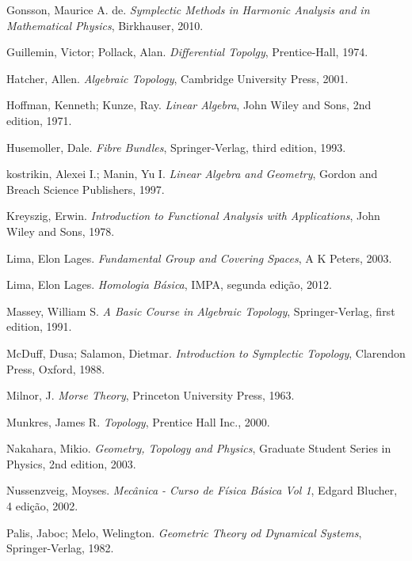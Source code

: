 \documentclass[12pt]{book}
\begin{document}
\begin{thebibliography}{9}
		Gonsson, Maurice A. de.
		\emph{Symplectic Methods in Harmonic Analysis and in Mathematical Physics},
		Birkhauser, 2010.	
		
		Guillemin, Victor; Pollack, Alan.
		\emph{Differential Topolgy},
		Prentice-Hall,
		1974.	
		
		Hatcher, Allen.
		\emph{Algebraic Topology},
		Cambridge University Press, 2001.
		
		Hoffman, Kenneth; Kunze, Ray.
		\emph{Linear Algebra},
		John Wiley and Sons, 2nd edition, 1971.
		
		Husemoller, Dale.
		\emph{Fibre Bundles},
		Springer-Verlag, third edition,
		1993.
		
		kostrikin, Alexei I.; Manin, Yu I.
		\emph{Linear Algebra and Geometry},
		Gordon and Breach Science Publishers, 1997.
		
		
		Kreyszig, Erwin.
		\emph{Introduction to Functional Analysis with Applications},
		John Wiley and Sons, 1978.
		
		
		Lima, Elon Lages.
		\emph{Fundamental Group and Covering Spaces},
		A K Peters, 2003.

		Lima, Elon Lages.
		\emph{Homologia Básica},
		IMPA, segunda edição, 2012.
		
		Massey, William S.
		\emph{A Basic Course in Algebraic Topology},
		Springer-Verlag, first edition,
		1991.
	
		McDuff, Dusa; Salamon, Dietmar.
		\emph{Introduction to Symplectic Topology},
		Clarendon Press, Oxford, 1988.
	
		Milnor, J.
		\emph{Morse Theory},
		Princeton University Press, 1963.

		Munkres, James R.
		\emph{Topology},
		Prentice Hall Inc., 2000.
				
		Nakahara, Mikio.
		\emph{Geometry, Topology and Physics},
		Graduate Student Series in Physics, 2nd edition,
		2003.
		
		Nussenzveig, Moyses.
		\emph{Mecânica - Curso de Física Básica Vol 1},
		Edgard Blucher, 4 edição,
		2002.
		
		Palis, Jaboc; Melo, Welington.
		\emph{Geometric Theory od Dynamical Systems},
		Springer-Verlag,
		1982.
		

\end{thebibliography}
\end{document}
